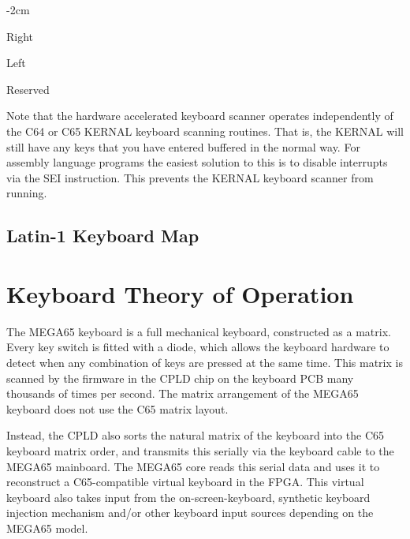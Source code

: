 \begin{adjustwidth}{}{-2cm}
\begin{multicols}{2}
\begin{description}[align=left,labelwidth=0.2cm]
\item[Bit 0] Right 
\item[Bit 1] Left 
\item[Bit 2] 
\item[Bit 3] \megasymbolkey
\item[Bit 4] 
\item[Bit 5] 
\item[Bit 6] 
\item[Bit 7] Reserved
\end{description}
\end{multicols}
\end{adjustwidth}

Note that the hardware accelerated keyboard scanner operates independently of the
C64 or C65 KERNAL keyboard scanning routines.  That is, the KERNAL will still have
any keys that you have entered buffered in the normal way. For assembly language
programs the easiest solution to this is to disable interrupts via the SEI
instruction.  This prevents the KERNAL keyboard scanner from running.


\subsection{Latin-1 Keyboard Map}

\section{Keyboard Theory of Operation}

The MEGA65 keyboard is a full mechanical keyboard, constructed as a matrix. Every
key switch is fitted with a diode, which allows the keyboard hardware to detect
when any combination of keys are pressed at the same time.  This matrix is scanned
by the firmware in the CPLD chip on the keyboard PCB many thousands of times per
second.  The matrix arrangement of the MEGA65 keyboard does not use the C65
matrix layout.

Instead, the CPLD also sorts the natural matrix of the keyboard
into the C65 keyboard matrix order, and transmits this serially via the keyboard
cable to the MEGA65 mainboard.  The MEGA65 core reads this serial data and uses it
to reconstruct a C65-compatible virtual keyboard in the FPGA.  This virtual keyboard
also takes input from the on-screen-keyboard, synthetic keyboard injection mechanism
and/or other keyboard input sources depending on the MEGA65 model.

